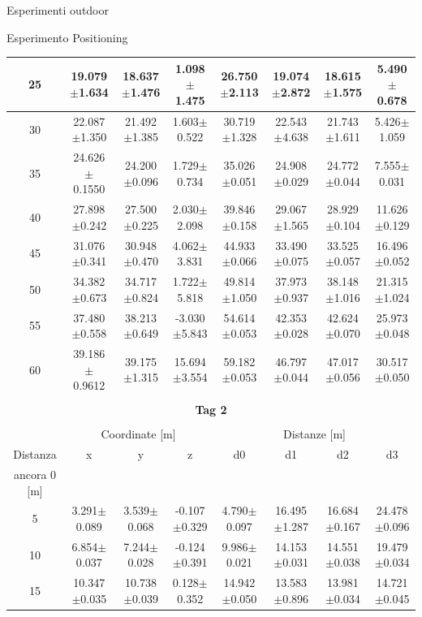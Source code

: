 \documentclass[12pt]{report}
\begin{document}
\begin{section}{Esperimenti outdoor}
\begin{subsection}{Esperimento Positioning}
\begin{table}[H]
{\begin{tabular}{|c||c|c|c||c|c|c|c||}
					\hline
					25&19.079$\pm$1.634&18.637$\pm$1.476&1.098$\pm$1.475&			26.750$\pm$2.113&19.074$\pm$2.872&18.615$\pm$1.575&5.490$\pm$0.678\\
					\hline
					30&22.087$\pm$1.350&21.492$\pm$1.385&1.603$\pm$0.522&			30.719$\pm$1.328&22.543$\pm$4.638&21.743$\pm$1.611&5.426$\pm$1.059\\
					\hline
					35&24.626$\pm$0.1550&24.200$\pm$0.096&1.729$\pm$0.734&		35.026$\pm$0.051&24.908$\pm$0.029&24.772$\pm$0.044&7.555$\pm$0.031\\
					\hline
					40&27.898$\pm$0.242&27.500$\pm$0.225&2.030$\pm$2.098&			39.846$\pm$0.158&29.067$\pm$1.565&28.929$\pm$0.104&11.626$\pm$0.129\\
					\hline
					45&31.076$\pm$0.341&30.948$\pm$0.470&4.062$\pm$3.831&			44.933$\pm$0.066&33.490$\pm$0.075&33.525$\pm$0.057&16.496$\pm$0.052\\
					\hline
					50&34.382$\pm$0.673&34.717$\pm$0.824&1.722$\pm$5.818&			49.814$\pm$1.050&37.973$\pm$0.937&38.148$\pm$1.016&21.315$\pm$1.024\\
					\hline
					55&37.480$\pm$0.558&38.213$\pm$0.649&-3.030$\pm$5.843&		54.614$\pm$0.053&42.353$\pm$0.028&42.624$\pm$0.070&25.973$\pm$0.048\\
					\hline
					60&39.186$\pm$0.9612&39.175$\pm$1.315&15.694$\pm$3.554&		59.182$\pm$0.053&46.797$\pm$0.044&47.017$\pm$0.056&30.517$\pm$0.050\\
					\hline
					\multicolumn{8}{|c|}{}\\
					\multicolumn{8}{|c|}{\textbf{\Large Tag 2}}\\
					\multicolumn{8}{|c|}{}\\
					\hline
					&\multicolumn{3}{|c||}{Coordinate [m]}&											\multicolumn{4}{|c||}{Distanze [m]}\\
					\hline
					Distanza&x& 				y& 				z& 														d0& 				d1&				d2&			d3\\
					ancora 0 [m]&&&&&&&\\
					\hline
					5&3.291$\pm$0.089&3.539$\pm$0.068&-0.107$\pm$0.329&			4.790$\pm$0.097&16.495$\pm$1.287&16.684$\pm$0.167&24.478$\pm$0.096\\
					\hline
   					 10&6.854$\pm$ 0.037&7.244$\pm$ 0.028&-0.124$\pm$0.391&			9.986$\pm$0.021&14.153$\pm$0.031&14.551$\pm$0.038&19.479$\pm$0.034\\
  					\hline 
					15&10.347$\pm$0.035&10.738$\pm$0.039&0.128$\pm$0.352&			14.942$\pm$0.050&13.583$\pm$0.896&13.981$\pm$0.034&14.721$\pm$0.045\\
					\hline

\end{tabular}}
\end{table}
\end{subsection}
\end{section}
\end{document}
